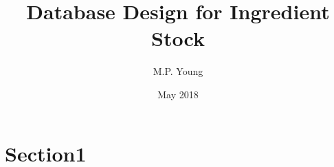 \documentclass[12pt]{article}
\begin{document}
\title{Database Design for Ingredient Stock}
\author{M.P. Young}
\date{May 2018}
\maketitle
{}
\section{Section1}
\end{document}
